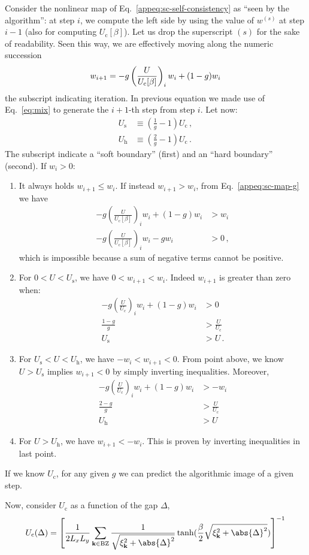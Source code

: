 Consider the nonlinear map of Eq.~\eqref{appeq:sc-self-consistency} as ``seen by the algorithm'': at step $i$, we compute the left side by using the value of $w^{(s)}$ at step $i-1$ (also for computing $U_\mathrm{c}[\beta]$). Let us drop the superscript $(s)$ for the sake of readability. Seen this way, we are effectively moving along the numeric succession
\begin{equation}\label{appeq:sc-map-g}
	w_{i+1} = -g\left(\frac{U}{U_{\mathrm{c}}[\beta]}\right)_i w_i + (1-g) w_i \\
\end{equation}
the subscript indicating iteration. In previous equation we made use of Eq.~\eqref{eq:mix} to generate the $i+1$-th step from step $i$. Let now:
\[
\begin{aligned}
	U_\mathrm{s} &\equiv \left(\frac{1}{g}-1\right) U_{\mathrm{c}} \, ,\\
	U_\mathrm{h} &\equiv \left(\frac{2}{g}-1\right) U_{\mathrm{c}} \, .
\end{aligned}
\]
The subscript indicate a ``soft boundary'' (first) and an ``hard boundary'' (second). If $w_i>0$:
\begin{enumerate}
	\item It always holds $w_{i+1} \le w_i$. If instead $w_{i+1}>w_i$, from Eq.~\eqref{appeq:sc-map-g} we have
	\[
	\begin{aligned}
		-g\left(\frac{U}{U_{\mathrm{c}}[\beta]}\right)_i w_i + (1-g) w_i &> w_i \\
		-g\left(\frac{U}{U_{\mathrm{c}}[\beta]}\right)_i w_i -g w_i &> 0 \, ,
	\end{aligned}
	\]
	which is impossible because a sum of negative terms cannot be positive.
	\item For $0 < U < U_\mathrm{s}$, we have $0 < w_{i+1} < w_i$. Indeed $w_{i+1}$ is greater than zero when:
	\[
	\begin{aligned}
		-g\left(\frac{U}{U_{\mathrm{c}}}\right)_i w_i + (1-g) w_i &> 0 \\
		\frac{1-g}{g} &> \frac{U}{U_{\mathrm{c}}} \\
		U_\mathrm{s} &> U \, .
	\end{aligned}
	\]
	\item For $U_\mathrm{s} < U < U_\mathrm{h}$, we have $-w_i < w_{i+1} < 0$. From point above, we know $U>U_\mathrm{s}$ implies $w_{i+1} < 0$ by simply inverting inequalities. Moreover,
	\[
	\begin{aligned}
		-g\left(\frac{U}{U_{\mathrm{c}}}\right)_i w_i + (1-g) w_i &> -w_i \\
		\frac{2-g}{g} &> \frac{U}{U_{\mathrm{c}}} \\
		U_\mathrm{h} &> U 
	\end{aligned}	
	\]
	\item For $U > U_\mathrm{h}$, we have $w_{i+1} < -w_i$. This is proven by inverting inequalities in last point.
\end{enumerate}
If we know $U_\mathrm{c}$, for any given $g$ we can predict the algorithmic image of a given step.

Now, consider $U_\mathrm{c}$ as a function of the gap $\Delta$,
\[
	U_\mathrm{c}(\Delta) = \left[
		\frac{1}{2 L_x L_y} \sum_{\mathbf{k}\in\mathrm{BZ}} \frac{1}{\sqrt{\xi_\mathbf{k}^2 + \abs{\Delta}^2}} \tanh(
			\frac{\beta}{2} \sqrt{\xi_\mathbf{k}^2 + \abs{\Delta}^2}
		)
	\right]^{-1}
\]
\todo